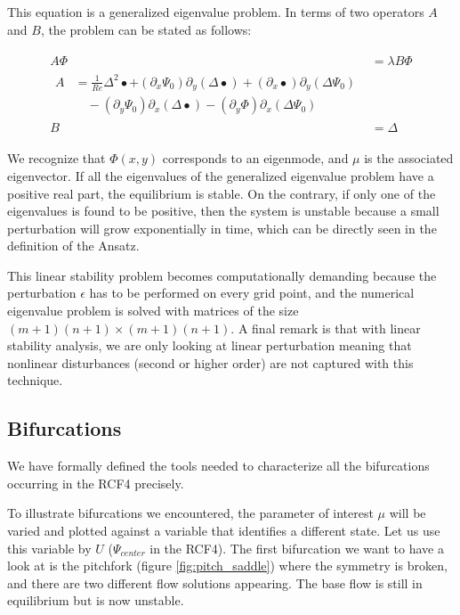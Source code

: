This equation is a generalized eigenvalue problem. In terms of two operators
$A$ and $B$, the problem can be stated as follows: 

\begin{align} \label{eq:eig_prob}
  \begin{split}
  A \Phi & = \lambda B \Phi \\[4pt]
  \begin{split}
  A & = \frac{1}{Re} \Delta^2 \bullet
    + (\partial_x \Psi_0) \partial_y (\Delta \bullet)
    + (\partial_x \bullet) \partial_y (\Delta \Psi_0) \\
    &\quad - (\partial_y \Psi_0) \partial_x (\Delta \bullet)
    - (\partial_y \Phi) \partial_x (\Delta \Psi_0)
  \end{split} \\
  B & = \Delta
  \end{split}
\end{align}

We recognize that $\Phi(x,y)$ corresponds to an eigenmode, and $\mu$ is the
associated eigenvector. If all the eigenvalues of the generalized eigenvalue
problem have a positive real part, the equilibrium is stable. On the contrary,
if only one of the eigenvalues is found to be positive, then the system is
unstable because a small perturbation will grow exponentially in time, which
can be directly seen in the definition of the Ansatz.

This linear stability problem becomes computationally demanding because the
perturbation $\epsilon$ has to be performed on every grid point, and the
numerical eigenvalue problem is solved with matrices of the size $(m+1)(n+1)
\times (m+1)(n+1)$. A final remark is that with linear stability analysis, we
are only looking at linear perturbation meaning that nonlinear disturbances
(second or higher order) are not captured with this technique.

\subsection{Bifurcations}

We have formally defined the tools needed to characterize all the bifurcations
occurring in the RCF4 precisely. 

To illustrate bifurcations we encountered, the parameter of interest $\mu$ will
be varied and plotted against a variable that identifies a different state. Let
us use this variable by $U$ ($\Psi_{center}$ in the RCF4). The first
bifurcation we want to have a look at is the pitchfork (figure
\ref{fig:pitch_saddle}) where the symmetry is broken, and there are two
different flow solutions appearing. The base flow is still in equilibrium but
is now unstable.

